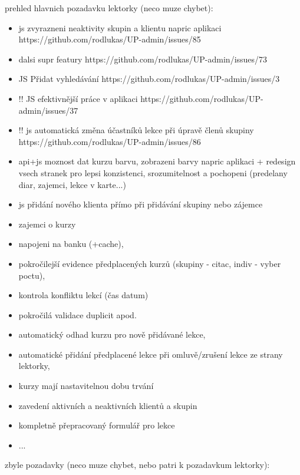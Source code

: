 prehled hlavnich pozadavku lektorky (neco muze chybet):
\begin{itemize}
\item js zvyrazneni neaktivity skupin a klientu napric aplikaci https://github.com/rodlukas/UP-admin/issues/85
\item dalsi supr featury https://github.com/rodlukas/UP-admin/issues/73
\item JS Přidat vyhledávání https://github.com/rodlukas/UP-admin/issues/3
\item !! JS efektivnější práce v aplikaci https://github.com/rodlukas/UP-admin/issues/37
\item !! js automatická změna účastníků lekce při úpravě členů skupiny https://github.com/rodlukas/UP-admin/issues/86
\item api+js moznost dat kurzu barvu, zobrazeni barvy napric aplikaci + redesign vsech stranek pro lepsi konzistenci, srozumitelnost a pochopeni (predelany diar, zajemci, lekce v karte...)
\item js přidání nového klienta přímo při přidávání skupiny nebo zájemce
\item zajemci o kurzy
\item napojeni na banku (+cache), 
\item pokročilejší evidence předplacených kurzů (skupiny - citac, indiv - vyber poctu), 
\item kontrola konfliktu lekcí (čas datum)
\item pokročilá validace duplicit apod.
\item automatický odhad kurzu pro nově přidávané lekce,
\item automatické přidání předplacené lekce při omluvě/zrušení lekce ze strany lektorky,
\item kurzy mají nastavitelnou dobu trvání
\item zavedení aktivních a neaktivních klientů a skupin
\item kompletně přepracovaný formulář pro lekce
\item ...
\end{itemize}


zbyle pozadavky (neco muze chybet, nebo patri k pozadavkum lektorky):

